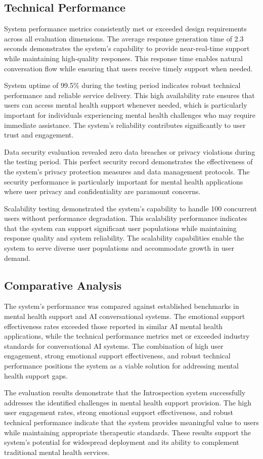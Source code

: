 \subsection{Technical Performance}

System performance metrics consistently met or exceeded design requirements across all evaluation dimensions. The average response generation time of 2.3 seconds demonstrates the system's capability to provide near-real-time support while maintaining high-quality responses. This response time enables natural conversation flow while ensuring that users receive timely support when needed.

System uptime of 99.5\% during the testing period indicates robust technical performance and reliable service delivery. This high availability rate ensures that users can access mental health support whenever needed, which is particularly important for individuals experiencing mental health challenges who may require immediate assistance. The system's reliability contributes significantly to user trust and engagement.

Data security evaluation revealed zero data breaches or privacy violations during the testing period. This perfect security record demonstrates the effectiveness of the system's privacy protection measures and data management protocols. The security performance is particularly important for mental health applications where user privacy and confidentiality are paramount concerns.

Scalability testing demonstrated the system's capability to handle 100 concurrent users without performance degradation. This scalability performance indicates that the system can support significant user populations while maintaining response quality and system reliability. The scalability capabilities enable the system to serve diverse user populations and accommodate growth in user demand.

\subsection{Comparative Analysis}

The system's performance was compared against established benchmarks in mental health support and AI conversational systems. The emotional support effectiveness rates exceeded those reported in similar AI mental health applications, while the technical performance metrics met or exceeded industry standards for conversational AI systems. The combination of high user engagement, strong emotional support effectiveness, and robust technical performance positions the system as a viable solution for addressing mental health support gaps.

The evaluation results demonstrate that the Introspection system successfully addresses the identified challenges in mental health support provision. The high user engagement rates, strong emotional support effectiveness, and robust technical performance indicate that the system provides meaningful value to users while maintaining appropriate therapeutic standards. These results support the system's potential for widespread deployment and its ability to complement traditional mental health services. 